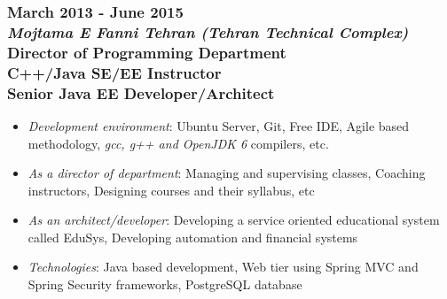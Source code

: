 \documentclass[10pt,a4paper]{article}
\begin{document}
\subsubsection{{March 2013 - June 2015} \\ \textnormal {\textit {Mojtama E Fanni Tehran (Tehran Technical Complex)}} \\ {Director of Programming Department \\ C++/Java SE/EE Instructor \\ Senior Java EE Developer/Architect}}
  \setlength{\leftskip}{0.5cm}
  \setlength{\rightskip}{1cm}
  \begin{itemize}
    \setlength{\rightskip}{1cm}
    \setlength\itemsep{0em}
    \item \small \textit {Development environment}: Ubuntu Server, Git, Free IDE, Agile based methodology, \textit {gcc, g++ and OpenJDK 6} compilers, etc.    
    \item \small \textit {As a director of department}: Managing and supervising classes, Coaching instructors, Designing courses and their syllabus, etc
    \item \small \textit {As an architect/developer}: Developing a service oriented educational system called EduSys, Developing automation and financial systems
    \item \small \textit {Technologies}: Java based development, Web tier using Spring MVC and Spring Security frameworks, PostgreSQL database
  \end{itemize}
  \setlength{\leftskip}{0pt}
  \setlength{\rightskip}{0cm}
	  
\end{document}
